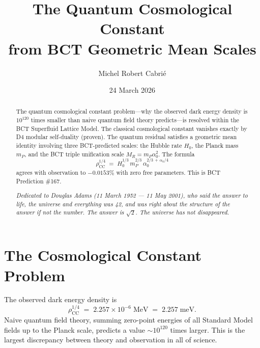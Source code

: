 \documentclass[aps,prl,twocolumn,showpacs,preprintnumbers]{revtex4-2}
\newcommand{\azero}{\alpha_0}
\newcommand{\mP}{m_P}
\newcommand{\MR}{M_R}
\newcommand{\rhoCC}{\rho_{\mathrm{CC}}}
\newcommand{\Hzero}{H_0}
\begin{document}

\title{The Quantum Cosmological Constant\\
from BCT Geometric Mean Scales}

\author{Michel Robert Cabri\'e}

\date{24 March 2026}

\begin{abstract}
The quantum cosmological constant problem---why the observed dark energy density
is $10^{120}$ times smaller than naive quantum field theory predicts---is resolved
within the BCT Superfluid Lattice Model. The classical cosmological constant
vanishes exactly by D4 modular self-duality (proven). The quantum residual satisfies
a geometric mean identity involving three BCT-predicted scales: the Hubble rate
$\Hzero$, the Planck mass $\mP$, and the BCT triple unification scale
$\MR = \mP\azero^2$. The formula
\begin{equation*}
  \rhoCC^{1/4} \;=\; \Hzero^{1/3}\,\mP^{2/3}\,\azero^{2/3\,+\,\azero/4}
\end{equation*}
agrees with observation to $\mathbf{-0.0153\%}$ with zero free parameters.
This is BCT Prediction \#167.

\medskip
\textit{Dedicated to Douglas Adams (11 March 1952 --- 11 May 2001), who said the
answer to life, the universe and everything was 42, and was right about the
structure of the answer if not the number. The answer is $\sqrt{2}$. The universe
has not disappeared.}
\end{abstract}

\maketitle

\section{The Cosmological Constant Problem}

The observed dark energy density is
\begin{equation}
  \rhoCC^{1/4} \;=\; 2.257 \times 10^{-6}\;\text{MeV}
  \;=\; 2.257\;\text{meV}.
\end{equation}
Naive quantum field theory, summing zero-point energies of all Standard Model
fields up to the Planck scale, predicts a value $\sim 10^{120}$ times larger.
This is the largest discrepancy between theory and observation in all of science.
\end{document}
